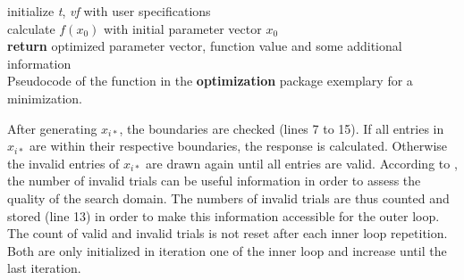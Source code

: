 \SetAlCapSkip{2ex}
\begin{algorithm}[H]
	initialize \textit{t}, \textit{vf} with user specifications\\
	calculate $f(x_0)$ with initial parameter vector $x_0$\\
	\textbf{return} optimized parameter vector, function value and some additional information \\
	\caption{Pseudocode of the  function in the \textbf{optimization} package exemplary for a minimization.}
	\label{alg:alg1}
\end{algorithm}

After generating $x_{i*}$, the boundaries are checked (lines 7 to 15). If all entries in $x_{i*}$ are within their respective boundaries, the response is calculated. Otherwise the invalid entries of $x_{i*}$ are drawn again until all entries are valid. According to \citet{corana_1987}, the number of invalid trials can be useful information in order to assess the quality of the search domain. The numbers of invalid trials are thus counted and stored (line 13) in order to make this information accessible for the outer loop. The count of valid and invalid trials is not reset after each inner loop repetition. Both are only initialized in iteration one of the inner loop and increase until the last iteration.


